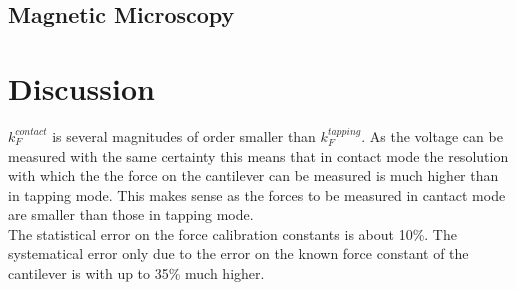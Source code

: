 \documentclass[%
 reprint,
amsmath,amssymb,
pra,
]{revtex4-1}
\begin{document}
\subsection{Magnetic Microscopy}



\section{Discussion}
$k_F^{contact}$ is several magnitudes of order smaller than $k_F^{tapping}$. As the voltage can be measured with the same certainty this means that in contact mode the resolution with which the the force on the cantilever can be measured is much higher than in tapping mode. This makes sense as the forces to be measured in cantact mode are smaller than those in tapping mode. \\
The statistical error on the force calibration constants is about 10\%. The systematical error only due to the error on the known force constant of the cantilever is with up to 35\% much higher. 








\end{document}
